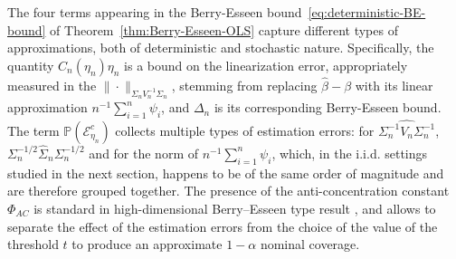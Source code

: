 \documentclass{article}
\begin{document}
 
 The four terms appearing in the Berry-Esseen bound~\eqref{eq:deterministic-BE-bound} of Theorem~\ref{thm:Berry-Esseen-OLS} capture different types of approximations, both of deterministic and stochastic nature. Specifically, the quantity  $C_n(\eta_n)\eta_n$ is a bound on the linearization  error, appropriately measured in the $\| \cdot \|_{ \Sigma_n V^{-1}_n\Sigma_n }$, stemming from replacing $\widehat{\beta} - \beta$ with its  linear approximation $n^{-1}\sum_{i=1}^n \psi_i$, and  $\Delta_n$  is its corresponding Berry-Esseen bound. The term $\mathbb{P}(\mathcal{E}_{\eta_n}^c)$ collects multiple types of estimation errors: for $\widehat{\Sigma_n^{-1}V_n\Sigma_n^{-1}}$, $\Sigma_n^{-1/2}\widehat{\Sigma}_n\Sigma_n^{-1/2}$ and for the norm of $n^{-1} \sum_{i=1}^n \psi_i$, which, in the i.i.d. settings studied in the next section, happens to be of the same order of magnitude and are therefore grouped together. The presence of the anti-concentration constant $\Phi_{AC}$ is standard in high-dimensional Berry--Esseen type result \citep{chernozhukov2017detailed}, and allows to separate the effect of the estimation errors from the choice of the value of the threshold $t$ to produce an approximate $1-\alpha$ nominal coverage. 
 
\end{document}
